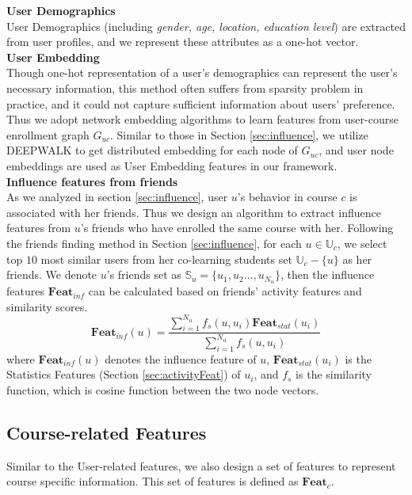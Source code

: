 	\noindent \textbf{User Demographics}\\
    User Demographics (including \emph{gender, age, location, education level}) are extracted from user profiles, and we represent these attributes as a one-hot vector.\\
    
	\noindent \textbf{User Embedding}\\
	Though one-hot representation of a user's demographics can represent the user's necessary information, this method often suffers from sparsity problem in practice, and it could not capture sufficient information about users' preference. Thus we adopt network embedding algorithms to learn features from user-course enrollment graph $G_{uc}$. Similar to those in Section \ref{sec:influence}, we utilize DEEPWALK \cite{Perozzi:2014:DOL:2623330.2623732} to get distributed embedding for each node of $G_{uc}$, and user node embeddings are used as User Embedding features in our framework.\\

	\noindent \textbf{Influence features from friends}\\
	  As we analyzed in section \ref{sec:influence}, user $u$'s behavior in course $c$ is associated with her friends. Thus we design an algorithm to extract influence features from $u$'s friends who have enrolled the same course with her. Following the friends finding method in Section \ref{sec:influence}, for each $u\in \mathbb{U}_c$, we select top $10$ most similar users from her co-learning students set $\mathbb{U}_c-\{u\}$ as her friends. We denote $u$'s friends set as $\mathbb{S}_u=\{u_1, u_2...,u_{N_u}\}$, then the influence features $\mathbf{Feat}_{inf}$ can be calculated based on friends' activity features and similarity scores.
	\begin{equation}
		\mathbf{Feat}_{inf}(u) = \frac{\sum_{i=1}^{N_u} f_s(u, u_i)\mathbf{Feat}_{stat}(u_i)}{\sum_{i=1}^{N_u} f_s(u, u_i)}
	\end{equation}
	where $\mathbf{Feat}_{inf}(u)$ denotes the influence feature of $u$, $\mathbf{Feat}_{stat}(u_i)$ is the Statistics Features (Section \ref{sec:activityFeat}) of $u_i$, and $f_s$ is the similarity function, which is cosine function between the two node vectors.
	
\subsection{Course-related Features}
	\label{sec:CFeat}
	Similar to the User-related features, we also design a set of features to represent course specific information. This set of features is defined as $\mathbf{Feat}_c$.\\
	
